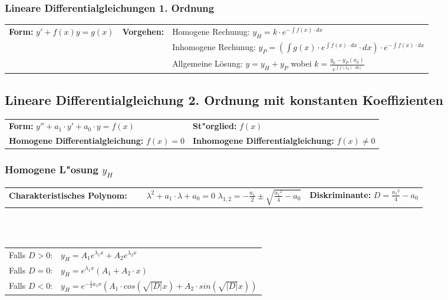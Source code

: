 \subsubsection{Lineare Differentialgleichungen 1. Ordnung }
\begin{tabular}{p{4cm}p{1.5cm}p{10.5cm}}
\textbf{Form:} $ y'+f(x)y = g(x) $ &
\textbf{Vorgehen:}                 &
Homogene Rechunug: $y_H = k \cdot e^{-\int f(x) \cdot dx}$\\ &&
Inhomogene Rechunug: $y_P = (\int g(x) \cdot e^{\int f(x) \cdot dx} \cdot dx)
\cdot e^{-\int f(x) \cdot dx}$\\ &&
Allgemeine Lösung: $y = y_H + y_P$ wobei $k = \frac{y_0 - y_P(x_0)}{e^{\int
f(x_0) \cdot dx)}}$
\end{tabular}

\subsection{Lineare Differentialgleichung 2. Ordnung mit konstanten 
Koeffizienten }
\begin{tabular}{p{8cm}p{8cm}}
\textbf{Form:} $y''+a_1\cdot y'+a_0\cdot y=f(x)$  &
\textbf{St"orglied:} $f(x)$\\
\textbf{Homogene Differentialgleichung:} $f(x)=0$ &
\textbf{Inhomogene Differentialgleichung:} $f(x)\neq 0$
\end{tabular}

\subsubsection{Homogene L"osung $y_H$}
\begin{tabular}{p{8cm}p{8cm}}
\textbf{Charakteristisches Polynom:} \newline
$\qquad\lambda^2+a_1\cdot\lambda+a_0=0$ \quad
$\lambda_{1,2} = -\frac{a_1}{2} \pm \sqrt{\frac{{a_1}^2}{4}-a_0}$ &
\textbf{Diskriminante:} \newline
$D = \frac{{a_1}^2}{4}-a_0$ 
\end{tabular} \\ \\

\begin{tabular}{p{4cm}p{12cm}}
Falls $D > 0$:&
$y_H=A_1e^{\lambda_1x}+A_2e^{\lambda_2x}$\\
Falls $D = 0$:&
$y_H=e^{\lambda_1x}(A_1+A_2\cdot x)$\\
Falls $D < 0$:&
$y_H=e^{-\frac{1}{2}a_1x}(A_1 \cdot cos(\sqrt{|D|} x) +A_2 \cdot sin(\sqrt{|D|}
x))$
\end{tabular}

